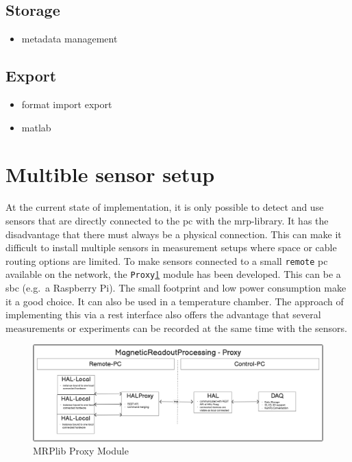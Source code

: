 \hypertarget{storage}{%
\subsection{Storage}\label{storage}}

\begin{itemize}
\tightlist
\item
  metadata management
\end{itemize}

\hypertarget{export}{%
\subsection{Export}\label{export}}

\begin{itemize}
\tightlist
\item
  format import export
\item
  matlab
\end{itemize}

\hypertarget{multible-sensor-setup}{%
\section{Multible sensor setup}\label{multible-sensor-setup}}

At the current state of implementation, it is only possible to detect
and use sensors that are directly connected to the \gls{pc} with the
\gls{mrp}-library. It has the disadvantage that there must always be a
physical connection. This can make it difficult to install multiple
sensors in measurement setups where space or cable routing options are
limited. To make sensors connected to a small
\passthrough{\lstinline!remote!} \gls{pc} available on the network, the
\passthrough{\lstinline!Proxy!}\ref{MRPlib_Proxy_Module.png} module has
been developed. This can be a \gls{sbc} (e.g.~a Raspberry Pi). The small
footprint and low power consumption make it a good choice. It can also
be used in a temperature chamber. The approach of implementing this via
a \gls{rest} interface also offers the advantage that several
measurements or experiments can be recorded at the same time with the
sensors.

\begin{figure}
\centering
\includegraphics{./generated_images/border_MRPlib_Proxy_Module.png}
\caption{MRPlib Proxy Module \label{MRPlib_Proxy_Module.png}}
\end{figure}

